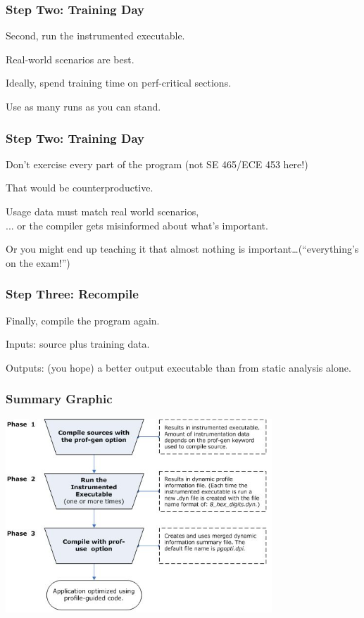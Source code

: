 \begin{frame}
\frametitle{Step Two: Training Day}



Second, run the instrumented executable.

Real-world scenarios are best.

Ideally, spend training time on perf-critical sections. 

Use as many runs as you can stand.

\end{frame}



\begin{frame}
\frametitle{Step Two: Training Day}



Don't exercise every part of the program (not SE 465/ECE 453 here!)

That would be counterproductive.

Usage data must match real world scenarios,\\
... or the compiler gets misinformed about what's important. 

Or you might end up teaching it that almost nothing
is important\ldots (``everything's on the exam!'')


\end{frame}



\begin{frame}
\frametitle{Step Three: Recompile}



Finally, compile the program again.

Inputs: source plus training data.

Outputs: (you hope) a better output executable than from static analysis alone.


\end{frame}



\begin{frame}
\frametitle{Summary Graphic}

\begin{center}
	\includegraphics[width=0.75\textwidth]{images/pogo-workflow.jpg}
\end{center}

\end{frame}



